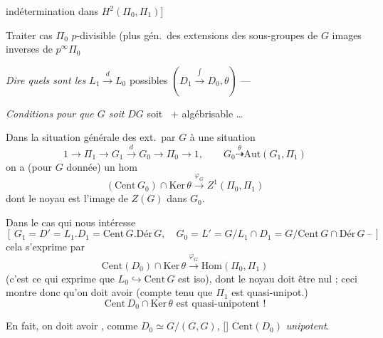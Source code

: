 \documentclass[11pt,a4paper]{article}
\begin{document}
indétermination dans $H^2(\Pi_0, \Pi_1)$]

Traiter cas $\Pi_0$ $p$-divisible (plus gén.\ des extensions des sous-groupes
de $G$ images inverses de $p^{\infty}\Pi_0$

\emph{Dire quels sont les} $L_1 \xrightarrow{d} L_0$ possibles
$(D_1 \xrightarrow{\int} D_0, \theta)$ —

\emph{Conditions pour que $G$ soit}  $DG$
soit  \ + algébrisable …

Dans la situation générale des ext.\ par $G$  à une
situation
\[
  1 \to \Pi_1 \to G_1 \xrightarrow{d} G_0 \to \Pi_0 \to 1, \qquad
  G_0 \overset{\theta}{\dashrightarrow} \mathrm{Aut}(G_1, \Pi_1)
\]
on a (pour  $G$ donnée) un hom
\[
  (\mathrm{Cent}\,G_0) \cap \mathrm{Ker}\,\theta \xrightarrow{\varphi_G}
  Z^1(\Pi_0, \Pi_1)
\]
dont le noyau est l'image de $Z(G)$ dans $G_0$.

Dans le cas qui nous intéresse
\[
  [\,G_1 = D' = L_1 . D_1 = \mathrm{Cent}\,G . \mathrm{Dér}\,G, \quad
  G_0 = L' = G / L_1 \cap D_1 = G/\mathrm{Cent}\,G \cap \mathrm{Dér}\,G
  \ \text{--}\,]
\]
cela \struck{\ill{}} s'exprime par
\[
  \mathrm{Cent}(D_0) \cap \mathrm{Ker}\,\theta \xrightarrow{\varphi_G}
  \mathrm{Hom}(\Pi_0, \Pi_1)
\]
(c'est ce qui exprime que $L_0 \hookrightarrow \mathrm{Cent}\,G$ est
iso), dont le noyau doit être nul ; ceci montre donc qu'on doit avoir
(compte tenu que $\Pi_1$ est quasi-unipot.)
\[
  \boxed{\mathrm{Cent}\,D_0 \cap \mathrm{Ker}\,\theta \text{ est
  quasi-unipotent !}}
\]

En fait, on doit avoir , comme
$D_0 \simeq G/(G, G)$, [] $\mathrm{Cent}(D_0)$ \emph{unipotent}.

\end{document}
